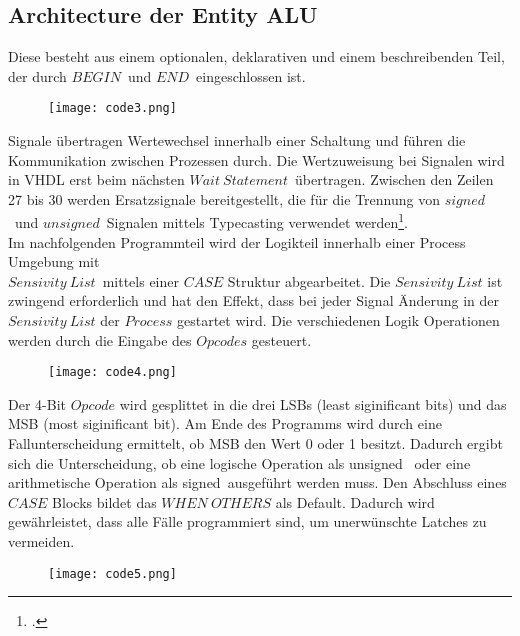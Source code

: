 \documentclass[12pt,a4paper]{scrartcl}	%
\begin{document}
\subsection{Architecture der Entity \glqq ALU\grqq}
Diese besteht aus einem optionalen, deklarativen und einem beschreibenden Teil, der durch $BEGIN$~und $END$~eingeschlossen ist. 
\begin{figure}[htb]
	
	\texttt{[image: code3.png]}
\end{figure}
Signale übertragen Wertewechsel innerhalb einer Schaltung und führen die Kommunikation zwischen Prozessen durch. Die Wertzuweisung bei Signalen wird in VHDL erst beim nächsten $Wait~Statement$~übertragen.
Zwischen den Zeilen 27 bis 30 werden Ersatzsignale bereitgestellt, die für die Trennung von $signed$~und $unsigned$~Signalen mittels Typecasting verwendet werden\footcite[vgl.][S. 75f.]{VHDL}.\\
Im nachfolgenden Programmteil wird der Logikteil innerhalb einer Process Umgebung mit\\ $Sensivity~List$~mittels einer $CASE$ Struktur abgearbeitet. Die $Sensivity~List$ ist zwingend erforderlich und hat den Effekt, dass bei jeder Signal Änderung in der $Sensivity~List$ der $Process$ gestartet wird. Die verschiedenen Logik Operationen werden durch die Eingabe des $Opcodes$ gesteuert. 
\begin{figure}[htb]
	
	\texttt{[image: code4.png]}
\end{figure}
Der 4-Bit $Opcode$ wird gesplittet in die drei LSBs (least siginificant bits) und das MSB (most siginificant bit). Am Ende des Programms wird durch eine Fallunterscheidung ermittelt, ob MSB den Wert 0 oder 1 besitzt. Dadurch ergibt sich die Unterscheidung, ob eine logische Operation als \glqq unsigned\grqq~ oder eine arithmetische Operation als \glqq signed\grqq~ausgeführt werden muss. Den Abschluss eines $CASE$ Blocks bildet das $WHEN~OTHERS$ als Default. Dadurch wird gewährleistet, dass alle Fälle programmiert sind, um unerwünschte Latches zu vermeiden.\\
\begin{figure}[htb]
	
	\texttt{[image: code5.png]}
\end{figure}
\end{document}
